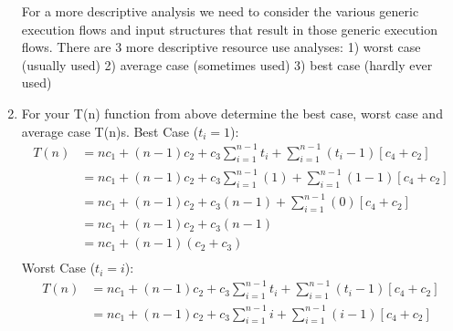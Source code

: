 \documentclass[12pt]{report}
\begin{document}
\begin{enumerate}[label=\arabic*.]
	For a more descriptive analysis we need to consider the various generic execution flows and input structures that result in those generic execution flows. There are 3 more descriptive resource use analyses: 1) worst case (usually used)  2) average case (sometimes used)  3) best case (hardly ever used)
	\item For your T(n) function from above determine the best case, worst case and average case T(n)s.
		Best Case ($t_{i}=1$):\begin{equation*}
	\begin{aligned}
		T(n)&=nc_{1}+(n-1)c_{2}+c_{3}\sum_{i=1}^{n-1}t_{i}+\sum_{i=1}^{n-1}(t_{i}-1)\left[ c_{4}+c_{2} \right]\\
			&=nc_{1}+(n-1)c_{2}+c_{3}\sum_{i=1}^{n-1}(1)+\sum_{i=1}^{n-1}(1-1)\left[ c_{4}+c_{2} \right]\\
			&=nc_{1}+(n-1)c_{2}+c_{3}(n-1)+\sum_{i=1}^{n-1}(0)\left[ c_{4}+c_{2} \right]\\
			&=nc_{1}+(n-1)c_{2}+c_{3}(n-1)\\
			&=nc_{1}+(n-1)(c_{2}+c_{3})\\
	\end{aligned}
	\end{equation*}
	Worst Case ($t_{i}=i$):\begin{equation*}
	\begin{aligned}
		T(n)&=nc_{1}+(n-1)c_{2}+c_{3}\sum_{i=1}^{n-1}t_{i}+\sum_{i=1}^{n-1}(t_{i}-1)\left[ c_{4}+c_{2} \right]\\
			&=nc_{1}+(n-1)c_{2}+c_{3}\sum_{i=1}^{n-1}i+\sum_{i=1}^{n-1}(i-1)\left[ c_{4}+c_{2} \right]\\
	\end{aligned}
	\end{equation*}
\end{enumerate}
\end{document}
